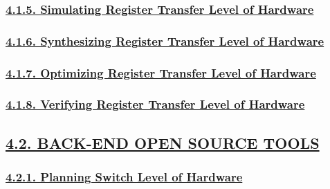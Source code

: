 \documentclass[
]{article}
\begin{document}
\hypertarget{simulating-register-transfer-level-of-hardware}{%
\subsubsection{\texorpdfstring{\protect\hyperlink{simulating-register-transfer-level-of-hardware-1}{4.1.5.
Simulating Register Transfer Level of
Hardware}}{4.1.5. Simulating Register Transfer Level of Hardware}}\label{simulating-register-transfer-level-of-hardware}}

\hypertarget{synthesizing-register-transfer-level-of-hardware}{%
\subsubsection{\texorpdfstring{\protect\hyperlink{synthesizing-register-transfer-level-of-hardware-1}{4.1.6.
Synthesizing Register Transfer Level of
Hardware}}{4.1.6. Synthesizing Register Transfer Level of Hardware}}\label{synthesizing-register-transfer-level-of-hardware}}

\hypertarget{optimizing-register-transfer-level-of-hardware}{%
\subsubsection{\texorpdfstring{\protect\hyperlink{optimizing-register-transfer-level-of-hardware-1}{4.1.7.
Optimizing Register Transfer Level of
Hardware}}{4.1.7. Optimizing Register Transfer Level of Hardware}}\label{optimizing-register-transfer-level-of-hardware}}

\hypertarget{verifying-register-transfer-level-of-hardware}{%
\subsubsection{\texorpdfstring{\protect\hyperlink{verifying-register-transfer-level-of-hardware-1}{4.1.8.
Verifying Register Transfer Level of
Hardware}}{4.1.8. Verifying Register Transfer Level of Hardware}}\label{verifying-register-transfer-level-of-hardware}}

\hypertarget{back-end-open-source-tools}{%
\subsection{\texorpdfstring{\protect\hyperlink{back-end-open-source-tools-2}{4.2.
BACK-END OPEN SOURCE
TOOLS}}{4.2. BACK-END OPEN SOURCE TOOLS}}\label{back-end-open-source-tools}}

\hypertarget{planning-switch-level-of-hardware}{%
\subsubsection{\texorpdfstring{\protect\hyperlink{planning-switch-level-of-hardware-1}{4.2.1.
Planning Switch Level of
Hardware}}{4.2.1. Planning Switch Level of Hardware}}\label{planning-switch-level-of-hardware}}
\end{document}
